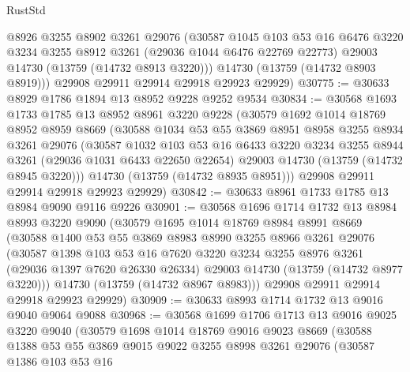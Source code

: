 \begin{lexlean}{RustStd}
\begin{coremodule}
        @8926
        @3255
        @8902
        @3261
        @29076
        (@30587
          @1045
          @103
          @53
          @16
          @6476
          @3220
          @3234
          @3255
          @8912
          @3261
          (@29036 @1044 @6476 @22769 @22773)
          @29003
          @14730
          (@13759 (@14732 @8913 @3220)))
        @14730
        (@13759 (@14732 @8903 @8919)))
      @29908
      @29911
      @29914
      @29918
      @29923
      @29929)
@30775 := @30633 @8929 @1786 @1894 @13 @8952 @9228 @9252 @9534
@30834 := @30568
    @1693
    @1733
    @1785
    @13
    @8952
    @8961
    @3220
    @9228
    (@30579
      @1692
      @1014
      @18769
      @8952
      @8959
      @8669
      (@30588
        @1034
        @53
        @55
        @3869
        @8951
        @8958
        @3255
        @8934
        @3261
        @29076
        (@30587
          @1032
          @103
          @53
          @16
          @6433
          @3220
          @3234
          @3255
          @8944
          @3261
          (@29036 @1031 @6433 @22650 @22654)
          @29003
          @14730
          (@13759 (@14732 @8945 @3220)))
        @14730
        (@13759 (@14732 @8935 @8951)))
      @29908
      @29911
      @29914
      @29918
      @29923
      @29929)
@30842 := @30633 @8961 @1733 @1785 @13 @8984 @9090 @9116 @9226
@30901 := @30568
    @1696
    @1714
    @1732
    @13
    @8984
    @8993
    @3220
    @9090
    (@30579
      @1695
      @1014
      @18769
      @8984
      @8991
      @8669
      (@30588
        @1400
        @53
        @55
        @3869
        @8983
        @8990
        @3255
        @8966
        @3261
        @29076
        (@30587
          @1398
          @103
          @53
          @16
          @7620
          @3220
          @3234
          @3255
          @8976
          @3261
          (@29036 @1397 @7620 @26330 @26334)
          @29003
          @14730
          (@13759 (@14732 @8977 @3220)))
        @14730
        (@13759 (@14732 @8967 @8983)))
      @29908
      @29911
      @29914
      @29918
      @29923
      @29929)
@30909 := @30633 @8993 @1714 @1732 @13 @9016 @9040 @9064 @9088
@30968 := @30568
    @1699
    @1706
    @1713
    @13
    @9016
    @9025
    @3220
    @9040
    (@30579
      @1698
      @1014
      @18769
      @9016
      @9023
      @8669
      (@30588
        @1388
        @53
        @55
        @3869
        @9015
        @9022
        @3255
        @8998
        @3261
        @29076
        (@30587
          @1386
          @103
          @53
          @16

\end{coremodule}
\end{lexlean}
